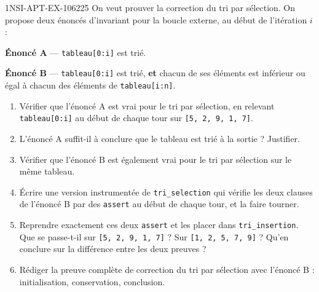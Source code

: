 \begin{exercice}{1NSI-APT-EX-106}{2}{25}
On veut prouver la correction du tri par sélection. On propose deux énoncés d'invariant
pour la boucle externe, au début de l'itération $i$ :

\medskip
\textbf{Énoncé A} — \lstinline{tableau[0:i]} est trié.

\textbf{Énoncé B} — \lstinline{tableau[0:i]} est trié, \textbf{et} chacun de ses éléments
est inférieur ou égal à chacun des éléments de \lstinline{tableau[i:n]}.
\medskip

\begin{enumerate}
  \item Vérifier que l'énoncé A est vrai pour le tri par sélection, en relevant
    \lstinline{tableau[0:i]} au début de chaque tour sur \lstinline{[5, 2, 9, 1, 7]}.
  \item L'énoncé A suffit-il à conclure que le tableau est trié à la sortie ? Justifier.
  \item Vérifier que l'énoncé B est également vrai pour le tri par sélection sur le même
    tableau.
  \item Écrire une version instrumentée de \lstinline{tri_selection} qui vérifie les deux
    clauses de l'énoncé B par des \lstinline{assert} au début de chaque tour, et la faire
    tourner.
  \item Reprendre exactement ces deux \lstinline{assert} et les placer dans
    \lstinline{tri_insertion}. Que se passe-t-il sur \lstinline{[5, 2, 9, 1, 7]} ? Sur
    \lstinline{[1, 2, 5, 7, 9]} ? Qu'en conclure sur la différence entre les deux preuves ?
  \item Rédiger la preuve complète de correction du tri par sélection avec l'énoncé B :
    initialisation, conservation, conclusion.
\end{enumerate}
\end{exercice}
